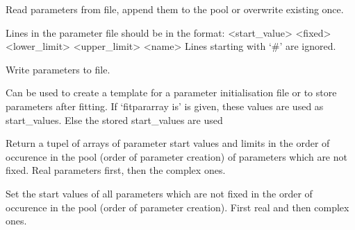 \documentclass[letterpaper,10pt,english]{sphinxmanual}
\begin{document}
\begin{fulllineitems}
\begin{fulllineitems}
\label{\detokenize{modules-api/parameters:Parameters.ParameterPool.readFromFile}}
Read parameters from file, append them to the pool or overwrite existing once.

Lines in the parameter file should be in the format: \textless{}start\_value\textgreater{}  \textless{}fixed\textgreater{} \textless{}lower\_limit\textgreater{} \textless{}upper\_limit\textgreater{} \textless{}name\textgreater{}
Lines starting with ‘\#’ are ignored.

\end{fulllineitems}


\begin{fulllineitems}
\label{\detokenize{modules-api/parameters:Parameters.ParameterPool.writeToFile}}
Write parameters to file.

Can be used to create a template for a parameter initialisation file or to store parameters after fitting.
If ‘fitpararray is’ is given, these values are used as start\_values. Else the stored start\_values are used

\end{fulllineitems}


\begin{fulllineitems}
\label{\detokenize{modules-api/parameters:Parameters.ParameterPool.getStartLowerUpper}}
Return a tupel of arrays of parameter start values and limits in the order of occurence in the pool (order of parameter creation) of parameters which are not fixed. Real parameters first, then the complex ones.

\end{fulllineitems}


\begin{fulllineitems}
\label{\detokenize{modules-api/parameters:Parameters.ParameterPool.setStartValues}}
Set the start values of all parameters which are not fixed in the order of occurence in the pool (order of parameter creation). First real and then complex ones.


\end{fulllineitems}
\end{fulllineitems}
\end{document}
